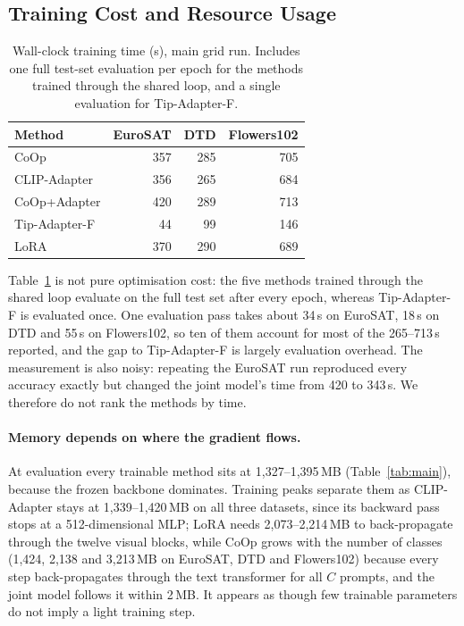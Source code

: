\documentclass[10pt,twocolumn,letterpaper]{article}
\begin{document}
\subsection{Training Cost and Resource Usage}\label{sec:cost}

\begin{table}[t]
\centering
\caption{Wall-clock training time (s), main grid run.  Includes one full
  test-set evaluation per epoch for the methods trained through the shared
  loop, and a single evaluation for Tip-Adapter-F.}
\label{tab:cost}
\small
\begin{tabular}{@{}lrrr@{}}
\toprule
\textbf{Method} & \textbf{EuroSAT} & \textbf{DTD} & \textbf{Flowers102} \\
\midrule
CoOp            & 357  & 285  & 705  \\
CLIP-Adapter    & 356  & 265  & 684  \\
CoOp+Adapter    & 420  & 289  & 713  \\
Tip-Adapter-F   &  44  &  99  & 146  \\
LoRA            & 370  & 290  & 689  \\
\bottomrule
\end{tabular}
\end{table}

Table~\ref{tab:cost} is not pure optimisation cost: the five methods
trained through the shared loop evaluate on the full test set after every
epoch, whereas Tip-Adapter-F is evaluated once.  One evaluation pass takes
about 34\,s on EuroSAT, 18\,s on DTD and 55\,s on Flowers102, so ten of
them account for most of the 265--713\,s reported, and the gap to
Tip-Adapter-F is largely evaluation overhead.  The measurement is also
noisy: repeating the EuroSAT run reproduced every accuracy exactly but
changed the joint model's time from 420 to 343\,s.  We therefore do not
rank the methods by time.

\paragraph{Memory depends on where the gradient flows.}
At evaluation every trainable method sits at 1{,}327--1{,}395\,MB
(Table~\ref{tab:main}), because the frozen backbone dominates.  Training
peaks separate them as CLIP-Adapter stays at 1{,}339--1{,}420\,MB on all
three datasets, since its backward pass stops at a 512-dimensional MLP;
LoRA needs 2{,}073--2{,}214\,MB to back-propagate through the twelve
visual blocks, while CoOp grows with the number of classes (1{,}424, 2{,}138
and 3{,}213\,MB on EuroSAT, DTD and Flowers102) because every step
back-propagates through the text transformer for all $C$ prompts, and the
joint model follows it within 2\,MB. It appears as though few trainable parameters do not
imply a light training step.
\end{document}
